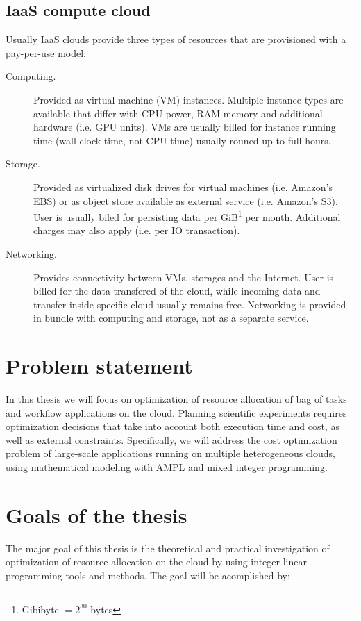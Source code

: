 \subsection{IaaS compute cloud}

Usually IaaS clouds provide three types of resources that are provisioned with a pay-per-use model: 
\begin{description}
  \item[Computing.] Provided as virtual machine (VM) instances. Multiple instance types are available that differ with CPU power, RAM memory and additional hardware (i.e. GPU units). VMs are usually billed for instance running time (wall clock time, not CPU time) usually rouned up to full hours.
  \item[Storage.] Provided as virtualized disk drives for virtual machines (i.e. Amazon's EBS) or as object store available as external service (i.e. Amazon's S3). User is usually biled for persisting data per GiB\footnote{Gibibyte $= 2^{30}$ bytes} per month. Additional charges may also apply (i.e. per IO transaction).
  \item[Networking.] Provides connectivity between VMs, storages and the Internet. User is billed for the data transfered of the cloud, while incoming data and transfer inside specific cloud usually remains free. Networking is provided in bundle with computing and storage, not as a separate service.
\end{description}

\section{Problem statement}
\label{intro:statement}

In this thesis we will focus on optimization of resource allocation of bag of tasks and workflow applications on the cloud. Planning scientific experiments requires optimization decisions that take into account both execution time and cost, as well as external constraints. Specifically, we will address the cost optimization problem of large-scale applications running on multiple heterogeneous clouds, using mathematical modeling with AMPL and mixed integer programming.

\section{Goals of the thesis}
\label{intro:goals}

The major goal of this thesis is the theoretical and practical investigation of optimization of resource allocation on the cloud by using integer linear programming tools and methods. The goal will be acomplished by:


